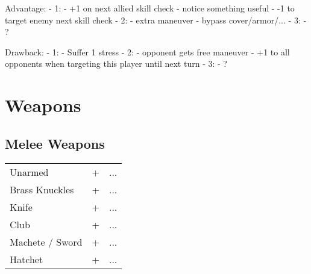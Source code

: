 Advantage:
    - 1:
        - +1 on next allied skill check
        - notice something useful
        - -1 to target enemy next skill check
    - 2:
        - extra maneuver
        - bypass cover/armor/...
    - 3:
        - ?

Drawback:
  - 1:
      - Suffer 1 stress
  - 2:
      - opponent gets free maneuver
      - +1 to all opponents when targeting this player until next turn
  - 3:
      - ?
  
\pagebreak
\section{Weapons}

\newcommand{\weapontable}[4][2]{
    {
    \protect\renewcommand{\arraystretch}{1.2}%
    \renewcommand\tabularxcolumn[1]{m{##1}} %
    \small
    \begin{threeparttable}
        \begin{tabularx}{\linewidth}{@{}m{1.0in}*{#1}{>{\centering\arraybackslash}m{0.5in}}X@{}}
            #2
            \toprule
            #3
            \bottomrule
        \end{tabularx}
        \ifthenelse{\isempty{#4}}
        {}{
            \begin{tablenotes}
                \footnotesize
                #4
            \end{tablenotes}
        }
    \end{threeparttable}
    \par
    }
}

\subsection{Melee Weapons}
\weapontable[1]{
    \thead[l]{Weapon} & \thead{Damage} & \thead[l]{Effects}\\
}{
    Unarmed         & 0+    & ...\\ 
    Brass Knuckles  & 2+    & ...\\ 
    Knife           & 2+    & ...\\ 
    Club            & 3+    & ...\\
    Machete / Sword & 4+    & ...\\ 
    Hatchet         & 4+    & ...\\
}{
}

